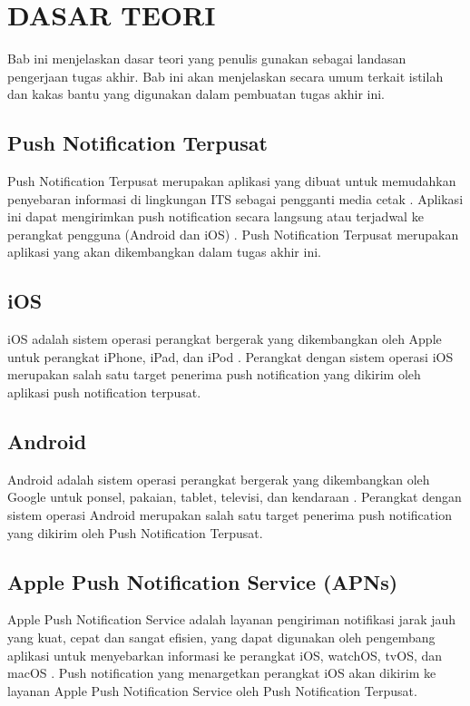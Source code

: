 \chapter{DASAR TEORI}
\par Bab ini menjelaskan dasar teori yang penulis gunakan sebagai landasan pengerjaan tugas akhir. Bab ini akan menjelaskan secara umum terkait istilah dan kakas bantu yang digunakan dalam pembuatan tugas akhir ini.

\section{Push Notification Terpusat}
\par Push Notification Terpusat merupakan aplikasi yang dibuat untuk memudahkan penyebaran informasi di lingkungan ITS sebagai pengganti media cetak \cite{application-thesis}. Aplikasi ini dapat mengirimkan push notification secara langsung atau terjadwal ke perangkat pengguna (Android dan iOS) \cite{application-thesis}. Push Notification Terpusat merupakan aplikasi yang akan dikembangkan dalam tugas akhir ini.

\section{iOS}
\par iOS adalah sistem operasi perangkat bergerak yang dikembangkan oleh Apple untuk perangkat iPhone, iPad, dan iPod \cite{ios-online}. Perangkat dengan sistem operasi iOS merupakan salah satu target penerima push notification yang dikirim oleh aplikasi push notification terpusat.

\section{Android}
\par Android adalah sistem operasi perangkat bergerak yang dikembangkan oleh Google untuk ponsel, pakaian, tablet, televisi, dan kendaraan \cite{android-online}. Perangkat dengan sistem operasi Android merupakan salah satu target penerima push notification yang dikirim oleh Push Notification Terpusat.

\section{Apple Push Notification Service (APNs)}
\par Apple Push Notification Service adalah layanan pengiriman notifikasi jarak jauh yang kuat, cepat dan sangat efisien, yang dapat digunakan oleh pengembang aplikasi untuk menyebarkan informasi ke perangkat iOS, watchOS, tvOS, dan macOS \cite{apns-online}. Push notification yang menargetkan perangkat iOS akan dikirim ke layanan Apple Push Notification Service oleh Push Notification Terpusat.

